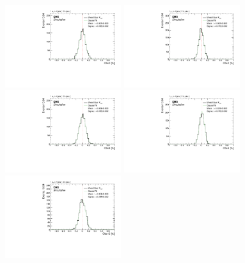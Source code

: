 \begin{figure}
    \centering
    \includegraphics[width=0.45\textwidth]{figure/SimAcp_16_el_Obs3_Acp_10_mixed.pdf}
    \includegraphics[width=0.45\textwidth]{figure/SimAcp_16_mu_Obs3_Acp_10_mixed.pdf}
    \includegraphics[width=0.45\textwidth]{figure/SimAcp_16_el_Obs6_Acp_10_mixed.pdf}
    \includegraphics[width=0.45\textwidth]{figure/SimAcp_16_mu_Obs6_Acp_10_mixed.pdf}
    \includegraphics[width=0.45\textwidth]{figure/SimAcp_16_el_Obs12_Acp_10_mixed.pdf}

\end{figure}
